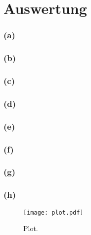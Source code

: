 \section{Auswertung}
\label{sec:Auswertung}


\subsubsection{(a)}
\label{subsubsec:auswertung_a}


\subsubsection{(b)}
\label{subsubsec:auswertung_b}


\subsubsection{(c)}
\label{subsubsec:auswertung_c}


\subsubsection{(d)}
\label{subsubsec:auswertung_d}


\subsubsection{(e)}
\label{subsubsec:auswertung_e}


\subsubsection{(f)}
\label{subsubsec:auswertung_f}


\subsubsection{(g)}
\label{subsubsec:auswertung_g}


\subsubsection{(h)}
\label{subsubsec:auswertung_h}






\begin{figure}
  \centering
  \texttt{[image: plot.pdf]}
  \caption{Plot.}
  \label{fig:plot}
\end{figure}
